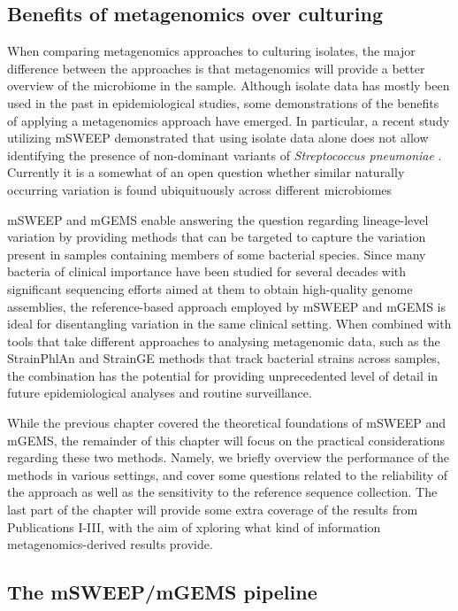 \documentclass[officiallayout]{tktla}
\begin{document}
\subsection{Benefits of metagenomics over culturing}

When comparing metagenomics approaches to culturing isolates, the
major difference between the approaches is that metagenomics will
provide a better overview of the microbiome in the sample. Although
isolate data has mostly been used in the past in epidemiological
studies, some demonstrations of the benefits of applying a
metagenomics approach have emerged. In particular, a recent study
utilizing mSWEEP demonstrated that using isolate data alone does not
allow identifying the presence of non-dominant variants of
\textit{Streptococcus pneumoniae}
\citep{tonkin-hill_pneumococcal_2022}. Currently it is a somewhat of
an open question whether similar naturally occurring variation is
found ubiquituously across different microbiomes

mSWEEP and mGEMS enable answering the question regarding lineage-level
variation by providing methods that can be targeted to capture the
variation present in samples containing members of some bacterial
species. Since many bacteria of clinical importance have been studied
for several decades with significant sequencing efforts aimed at them
to obtain high-quality genome assemblies, the reference-based approach
employed by mSWEEP and mGEMS is ideal for disentangling variation in
the same clinical setting. When combined with tools that take
different approaches to analysing metagenomic data, such as the
StrainPhlAn \citep{truong2017microbial} and StrainGE
\citep{van2022strainge} methods that track bacterial strains across
samples, the combination has the potential for providing unprecedented
level of detail in future epidemiological analyses and routine
surveillance.

While the previous chapter covered the theoretical foundations of
mSWEEP and mGEMS, the remainder of this chapter will focus on the
practical considerations regarding these two methods. Namely, we
briefly overview the performance of the methods in various settings,
and cover some questions related to the reliability of the approach as
well as the sensitivity to the reference sequence collection. The last
part of the chapter will provide some extra coverage of the results
from Publications I-III, with the aim of xploring what kind of
information metagenomics-derived results provide.

\subsection{The mSWEEP/mGEMS pipeline}
\end{document}
